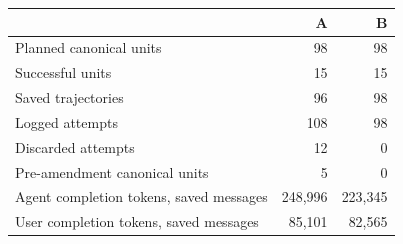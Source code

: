 \begin{tabular}{lrr}\toprule
 & A & B\\\midrule
Planned canonical units & 98 & 98 \\
Successful units & 15 & 15 \\
Saved trajectories & 96 & 98 \\
Logged attempts & 108 & 98 \\
Discarded attempts & 12 & 0 \\
Pre-amendment canonical units & 5 & 0 \\
Agent completion tokens, saved messages & 248,996 & 223,345 \\
User completion tokens, saved messages & 85,101 & 82,565 \\
\bottomrule\end{tabular}
